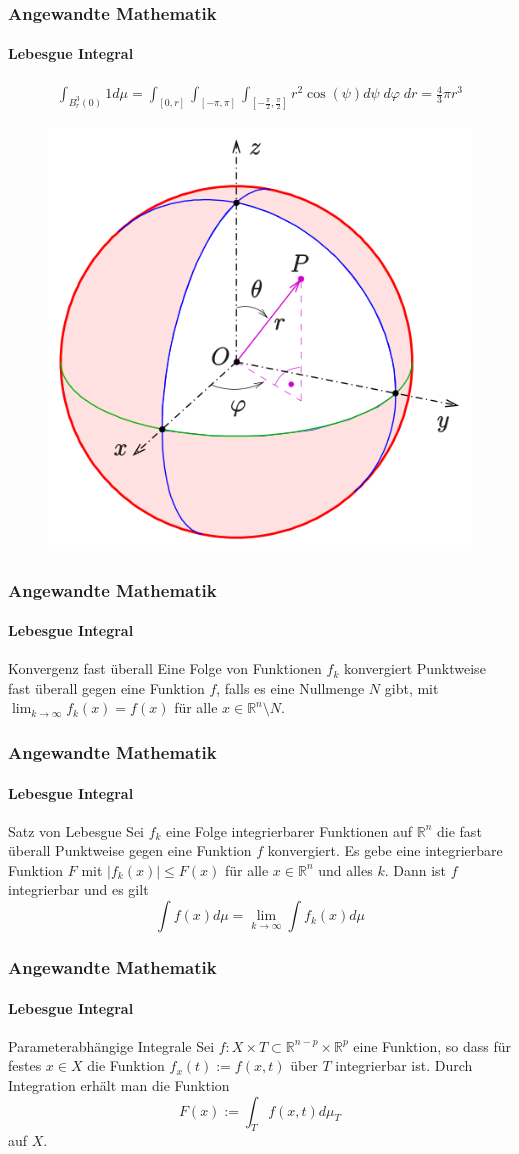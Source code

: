 \documentclass{beamer}
\begin{document}
\begin{frame}
    \frametitle{Angewandte Mathematik}
\framesubtitle{Lebesgue Integral}
\begin{align*}
\int_{B_r^3(0)} 1 d\mu = \int_{ [0,r] } \int_{ [- \pi, \pi]} \int_{[- \frac{\pi}{2}, \frac{\pi}{2}]} r^2 \cos(\psi) d \psi \; d \varphi \; dr = \frac{4} {3} \pi r^3
\end{align*}
\begin{figure}[H]
      \centering
    \includegraphics[width=0.4 \textwidth]{images/500px-Kugelkoord-def}    
\end{figure}
 \end{frame}



\begin{frame}
    \frametitle{Angewandte Mathematik}
\framesubtitle{Lebesgue Integral}
\begin{block}{Konvergenz fast überall}
Eine Folge von Funktionen $f_k$ konvergiert Punktweise fast überall gegen eine Funktion $f$, falls es eine Nullmenge $N$ gibt, mit 
$\lim_{k \to \infty} f_k (x) = f(x)$ für alle $x \in \mathbb{R}^n \setminus N$.
\end{block}
 \end{frame}


\begin{frame}
    \frametitle{Angewandte Mathematik}
\framesubtitle{Lebesgue Integral}
\begin{block}{Satz von Lebesgue}
Sei $f_k$ eine Folge integrierbarer Funktionen auf $\mathbb{R}^n$ die fast überall Punktweise gegen eine Funktion $f$ konvergiert.
Es gebe eine integrierbare Funktion $F$ mit $|f_k (x)| \leq F(x) $ für alle $x \in \mathbb{R}^n$ und alles $k$. Dann ist $f$ integrierbar und es gilt
$$ \int f(x) d \mu = \lim_{k \to \infty} \int f_k(x) d \mu $$
\end{block}
 \end{frame}



\begin{frame}
    \frametitle{Angewandte Mathematik}
\framesubtitle{Lebesgue Integral}
\begin{block}{Parameterabhängige Integrale}
Sei $f: X \times T \subset \mathbb{R}^{n-p} \times \mathbb{R}^p$ eine Funktion, so dass für festes $x \in X$ die Funktion $f_x(t) := f(x,t)$ über $T$ integrierbar ist. Durch Integration erhält man die Funktion 
$$ F(x) := \int_T f(x,t)  d \mu_T$$ 
auf $X$.
\end{block}
 \end{frame}
\end{document}
